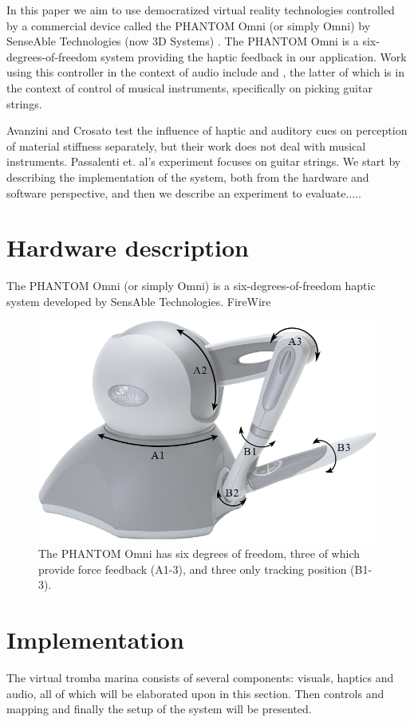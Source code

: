 \documentclass[dvipsnames, pdftex]{article}
\begin{document}
In this paper we aim to use democratized virtual reality technologies controlled by a commercial device called the
 PHANTOM Omni (or simply Omni) by SenseAble Technologies (now 3D Systems) \cite{phantom}.
 The PHANTOM Omni is a six-degrees-of-freedom system providing the haptic feedback in our application. Work using this controller in the context of audio include \cite{avanzini2006} and \cite{passalenti2019}, the latter of which is in the context of control of musical instruments, specifically on picking guitar strings.

Avanzini and Crosato test the influence of haptic and auditory cues on perception of material stiffness separately, but their work does not deal with musical instruments. Passalenti et. al's experiment focuses on guitar strings.
We start by describing the implementation of the system, both from the hardware and software perspective, and then we describe an experiment to evaluate..... 


\section{Hardware description}
The PHANTOM Omni (or simply Omni) is a six-degrees-of-freedom haptic system developed by SensAble Technologies. FireWire
\begin{figure}[ht]\includegraphics[width=1.0\columnwidth]{figures/omniSchematic.png}
\centering
  \caption{The PHANTOM Omni has six degrees of freedom, three of which provide force feedback (A1-3), and three only tracking position (B1-3). \label{fig:omni}}
\end{figure}

\section{Implementation}
The virtual tromba marina consists of several components: visuals, haptics and audio, all of which will be elaborated upon in this section. Then controls and mapping and finally the setup of the system will be presented.
\end{document}

